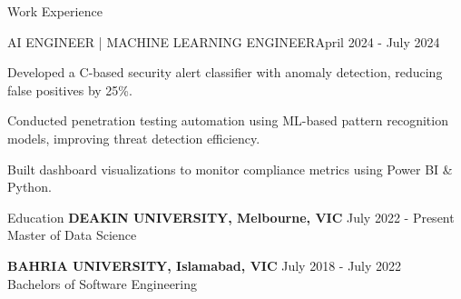 \documentclass{resume} %
\begin{document}
    \begin{rSection}{Work Experience}
                    \begin{rSubsection}
                {AI ENGINEER | MACHINE LEARNING ENGINEER}{April 2024 - July 2024}
                                    {}
                                {}
                                    \item Developed a C{-}based security alert classifier with anomaly detection, reducing false positives by 25\%.
                                    \item Conducted penetration testing automation using ML{-}based pattern recognition models, improving threat detection efficiency.
                                    \item Built dashboard visualizations to monitor compliance metrics using Power BI \& Python.
                            \end{rSubsection}
            \end{rSection}

\begin{rSection}{Education}
                        \textbf{DEAKIN UNIVERSITY, Melbourne, VIC} \hfill {July 2022 - Present} \\
                            {Master of Data Science}
                         
             
         
                        \textbf{BAHRIA UNIVERSITY, Islamabad, VIC} \hfill {July 2018 - July 2022} \\
                            {Bachelors of Software Engineering}
                         
             
         
    \end{rSection}
\end{document}
